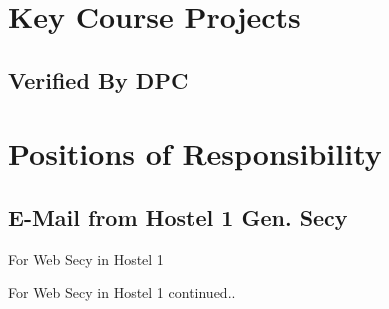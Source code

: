 \documentclass{article}
\begin{document}
\section{Key Course Projects}
	\subsection{Verified By DPC}
	
\newpage
\section{Positions of Responsibility}
	\subsection{E-Mail from Hostel 1 Gen. Secy}
		For Web Secy in Hostel 1
		\begin{figure}[h]
		\end{figure}
\newpage
		\noindent For Web Secy in Hostel 1 continued..
\end{document}
